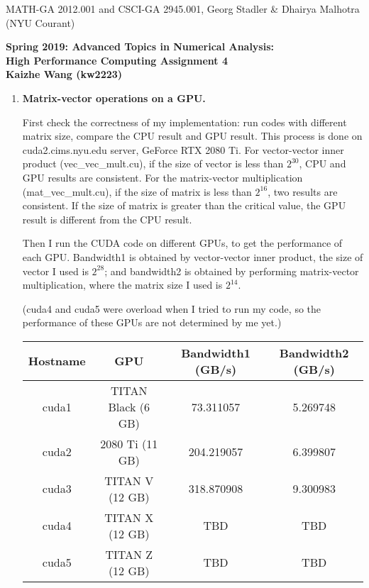 \documentclass[12pt]{article}
\begin{document}
\begin{center}
  \vspace*{-2cm}
{\small MATH-GA 2012.001 and CSCI-GA 2945.001, Georg Stadler \&
  Dhairya Malhotra (NYU Courant)}
\end{center}
\vspace*{.5cm}
\begin{center}
\large \textbf{%
Spring 2019: Advanced Topics in Numerical Analysis: \\
High Performance Computing Assignment 4\\
Kaizhe Wang (kw2223) }
\end{center}

\begin{enumerate}

\item {\bf Matrix-vector operations on a GPU.} 
  
  First check the correctness of my implementation: run codes with different matrix size, 
  compare the CPU result and GPU result. This process is done on cuda2.cims.nyu.edu server, 
  GeForce RTX 2080 Ti. For vector-vector inner product (vec\_vec\_mult.cu), if the size of vector is less than $2^{30}$,
  CPU and GPU results are consistent. For the matrix-vector multiplication (mat\_vec\_mult.cu), 
  if the size of matrix is less than $2^{16}$, two results are consistent. If the size of matrix is greater than the critical value, 
  the GPU result is different from the CPU result.
  
  Then I run the CUDA code on different GPUs, to get the performance of each GPU. Bandwidth1 is obtained by vector-vector inner product, the size of vector I used is $2^{28}$; and bandwidth2 is obtained by performing matrix-vector multiplication, where the matrix size I used is $2^{14}$.
  
  (cuda4 and cuda5 were overload when I tried to run my code, so the performance of these GPUs are not determined by me yet.)
  
  \begin{center}
\begin{tabular}{ |c|c|c|c| } 
 \hline
 Hostname    &   GPU   &    Bandwidth1 (GB/s)  &  Bandwidth2 (GB/s)\\
 \hline
        cuda1   & TITAN Black (6 GB)  &   73.311057 & 5.269748\\
       cuda2   &  2080 Ti (11 GB) & 204.219057  & 6.399807 \\
        cuda3  & TITAN V (12 GB)  & 318.870908  & 9.300983\\
       cuda4  &  TITAN X (12 GB)  & TBD   & TBD\\
       cuda5  & TITAN Z (12 GB) & TBD  & TBD\\
  \hline
\end{tabular}
\end{center}


\end{enumerate}
\end{document}
